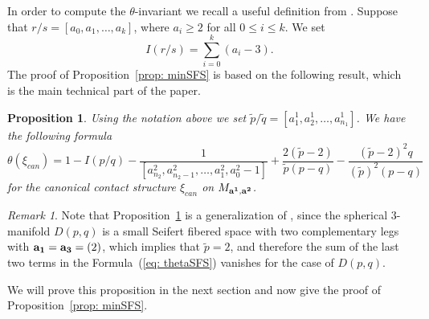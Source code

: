\documentclass[11pt]{amsart}
\theoremstyle{plain}
\newtheorem{proposition}[theorem]{Proposition}
\theoremstyle{definition}
\theoremstyle{remark}
\newtheorem{remark}[theorem]{Remark}
\numberwithin{theorem}{section}
\begin{document}
In order to compute the $\theta$-invariant we recall a useful definition from \cite{Lisca2007}. 
Suppose that $r/s=[a_0, a_1, \ldots, a_k]$, where $a_i \geq 2$ for all $0 \leq i \leq k$. We set $$I(r/s)=\sum_{i=0}^{k} (a_i-3).$$ 
The proof of Proposition~\ref{prop: minSFS} is based on the following result, which is the main technical part of the paper. 

\begin{proposition} \label{prop: thetaSFS}   Using the notation above we set  $\widetilde{p}/\widetilde{q}=[a^1_1, a^1_2, \ldots, a^1_{n_1}]$. We have the following formula 
\begin{equation}\label{eq: thetaSFS}
\theta (\xi_{can}) =1- I(p/q)-\dfrac{1}{[a^2_{n_2}, a^2_{n_2-1}, \ldots, a^2_1, a^2_0-1]} +\dfrac{2(\widetilde{p}-2)}{\widetilde{p}(p-q)} -\dfrac{(\widetilde{p}-2)^2 q}{(\widetilde{p})^2(p-q)} \end{equation}
for the canonical contact structure $\xi_{can}$ on $M_{{\bf a^1}, {\bf a^2}}$. 
\end{proposition} 

\begin{remark} Note that  Proposition~\ref{prop: thetaSFS} is a generalization of \cite[Proposition 9.8]{EtnyreOzbagciTosun2025}, since the spherical $3$-manifold $D(p,q)$ is a small Seifert fibered space with two complementary legs with ${\bf a_1}={\bf a_3}=(2)$, which implies that $\widetilde{p}=2$, and therefore the sum of the last two terms in the Formula~(\ref{eq: thetaSFS}) vanishes for the case of $D(p,q)$. 
\end{remark}

We will prove this proposition in the next section and now give the proof of Proposition~\ref{prop: minSFS}.
\end{document}
